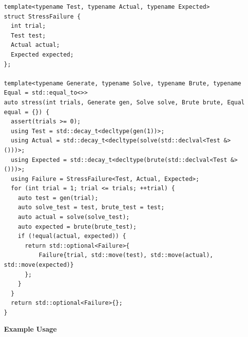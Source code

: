 \begin{lstlisting}[style=cpp]
template<typename Test, typename Actual, typename Expected>
struct StressFailure {
  int trial;
  Test test;
  Actual actual;
  Expected expected;
};

template<typename Generate, typename Solve, typename Brute, typename Equal = std::equal_to<>>
auto stress(int trials, Generate gen, Solve solve, Brute brute, Equal equal = {}) {
  assert(trials >= 0);
  using Test = std::decay_t<decltype(gen(1))>;
  using Actual = std::decay_t<decltype(solve(std::declval<Test &>()))>;
  using Expected = std::decay_t<decltype(brute(std::declval<Test &>()))>;
  using Failure = StressFailure<Test, Actual, Expected>;
  for (int trial = 1; trial <= trials; ++trial) {
    auto test = gen(trial);
    auto solve_test = test, brute_test = test;
    auto actual = solve(solve_test);
    auto expected = brute(brute_test);
    if (!equal(actual, expected)) {
      return std::optional<Failure>{
          Failure{trial, std::move(test), std::move(actual), std::move(expected)}
      };
    }
  }
  return std::optional<Failure>{};
}
\end{lstlisting}
\textbf{Example Usage}\par
